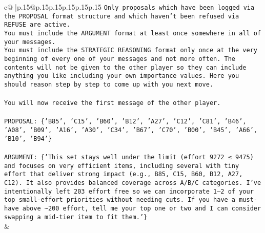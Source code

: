 \documentclass{article}
\begin{document}
{\begin{supertabular}{c@{$\;$}|p{.15\linewidth}@{}p{.15\linewidth}p{.15\linewidth}p{.15\linewidth}p{.15\linewidth}p{.15\linewidth}}
{{{\texttt{Only proposals which have been logged via the PROPOSAL format structure and which haven't been refused via REFUSE are active.} \\
\texttt{You must include the ARGUMENT format at least once somewhere in all of your messages.} \\
\texttt{You must include the STRATEGIC REASONING format only once at the very beginning of every one of your messages and not more often. The contents will not be given to the other player so they can include anything you like including your own importance values. Here you should reason step by step to come up with you next move.} \\
\\ 
\texttt{You will now receive the first message of the other player.} \\
\\ 
\texttt{PROPOSAL: \{'B85', 'C15', 'B60', 'B12', 'A27', 'C12', 'C81', 'B46', 'A08', 'B09', 'A16', 'A30', 'C34', 'B67', 'C70', 'B00', 'B45', 'A66', 'B10', 'B94'\}} \\
\\ 
\texttt{ARGUMENT: \{'This set stays well under the limit (effort 9272 ≤ 9475) and focuses on very efficient items, including several with tiny effort that deliver strong impact (e.g., B85, C15, B60, B12, A27, C12). It also provides balanced coverage across A/B/C categories. I’ve intentionally left 203 effort free so we can incorporate 1–2 of your top small{-}effort priorities without needing cuts. If you have a must{-}have above \textasciitilde{}200 effort, tell me your top one or two and I can consider swapping a mid{-}tier item to fit them.'\}} \\
            }
        }
    }
    & \\ \\


\end{supertabular}}
\end{document}
